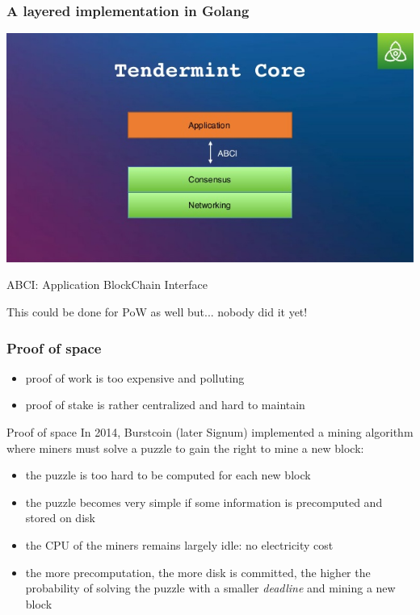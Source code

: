 \documentclass[11pt]{beamer}  %
\begin{document}
\begin{frame}\frametitle{A layered implementation in Golang}

  \begin{center}
    \includegraphics[scale=.38,clip=false]{pictures/tendermint-core.jpg}
  \end{center}

  \smallskip

  ABCI: Application BlockChain Interface

  \smallskip

  This could be done for PoW as well but... nobody did it yet!
  
\end{frame}

\begin{frame}\frametitle{Proof of space}

  \begin{itemize}
  \item proof of work is too expensive and polluting
  \item proof of stake is rather centralized and hard to maintain
  \end{itemize}

  \medskip

  \begin{greenbox}{Proof of space}
    In 2014, Burstcoin (later Signum) implemented a mining algorithm
    where miners must solve a puzzle to gain the right to mine a new block:
    \begin{itemize}
    \item the puzzle is too hard to be computed for each new block
    \item the puzzle becomes very simple if some information is precomputed and stored on disk
    \item the CPU of the miners remains largely idle: no electricity cost
    \item the more precomputation, the more disk is committed, the higher the probability of solving the puzzle with a smaller \emph{deadline} and mining a new block
    \end{itemize}
  \end{greenbox}
  
\end{frame}
\end{document}
